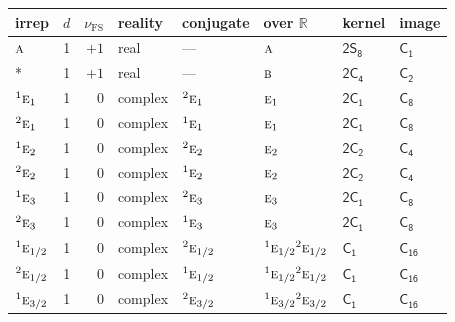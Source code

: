 \documentclass[10pt,a4paper]{article}
\makeatletter
\def\grouprule#1#2{\noalign{\marks\LTgroupmarks{\the\belowrulesep}\nobreak\vskip#1%
  \vskip\aboverulesep}\multispan\LT@cols\unskip{\leaders\hrule\@height#2\hfill\kern\z@}\cr
  \noalign{\penalty\LTrulebreak\vskip\belowrulesep\global\@lastruleclass\z@}}
\numberwithin{equation}{section}
\newcommand{\grp}[1]{\mathsf{#1}}
\newcommand{\irr}[1]{\text{\normalfont\scshape #1}}
\newcommand{\conjpair}[1]{{}^{#1}}
\newcommand{\detbox}[1]{{\setlength{\fboxsep}{1pt}\fbox{#1}}}
\newcommand{\fsind}{\nu_{\mathrm{FS}}}
\makeatother
\begin{document}
{\small\renewcommand{\arraystretch}{1.25}\setlength{\tabcolsep}{4pt}\begin{longtable}{@{}lrrlllll@{}}\toprule
irrep & $d$ & $\fsind$ & reality & conjugate & over $\mathbb{R}$ & kernel & image\\\midrule\endhead
\bottomrule\endfoot\endlastfoot
$\irr{a}$ & 1 & $+1$ & real & --- & $\irr{a}$ & \href{2S8.pdf}{$\grp{2S_{8}}$} & \href{../../../rotation/data/pdf/C1.pdf}{$\grp{C_{1}}$}\\*
\detbox{$\irr{b}$} & 1 & $+1$ & real & --- & $\irr{b}$ & \href{2C4.pdf}{$\grp{2C_{4}}$} & \href{../../../rotation/data/pdf/C2.pdf}{$\grp{C_{2}}$}\\
$\conjpair{1}\irr{e}_{1}$ & 1 & $0$ & complex & $\conjpair{2}\irr{e}_{1}$ & $\irr{e}_{1}$ & \href{2C1.pdf}{$\grp{2C_{1}}$} & \href{../../../rotation/data/pdf/C8.pdf}{$\grp{C_{8}}$}\\
$\conjpair{2}\irr{e}_{1}$ & 1 & $0$ & complex & $\conjpair{1}\irr{e}_{1}$ & $\irr{e}_{1}$ & \href{2C1.pdf}{$\grp{2C_{1}}$} & \href{../../../rotation/data/pdf/C8.pdf}{$\grp{C_{8}}$}\\
$\conjpair{1}\irr{e}_{2}$ & 1 & $0$ & complex & $\conjpair{2}\irr{e}_{2}$ & $\irr{e}_{2}$ & \href{2C2.pdf}{$\grp{2C_{2}}$} & \href{../../../rotation/data/pdf/C4.pdf}{$\grp{C_{4}}$}\\
$\conjpair{2}\irr{e}_{2}$ & 1 & $0$ & complex & $\conjpair{1}\irr{e}_{2}$ & $\irr{e}_{2}$ & \href{2C2.pdf}{$\grp{2C_{2}}$} & \href{../../../rotation/data/pdf/C4.pdf}{$\grp{C_{4}}$}\\
$\conjpair{1}\irr{e}_{3}$ & 1 & $0$ & complex & $\conjpair{2}\irr{e}_{3}$ & $\irr{e}_{3}$ & \href{2C1.pdf}{$\grp{2C_{1}}$} & \href{../../../rotation/data/pdf/C8.pdf}{$\grp{C_{8}}$}\\
$\conjpair{2}\irr{e}_{3}$ & 1 & $0$ & complex & $\conjpair{1}\irr{e}_{3}$ & $\irr{e}_{3}$ & \href{2C1.pdf}{$\grp{2C_{1}}$} & \href{../../../rotation/data/pdf/C8.pdf}{$\grp{C_{8}}$}\\
\grouprule{0pt}{\lightrulewidth}
$\conjpair{1}\irr{e}_{1/2}$ & 1 & $0$ & complex & $\conjpair{2}\irr{e}_{1/2}$ & $\conjpair{1}\irr{e}_{1/2}\conjpair{2}\irr{e}_{1/2}$ & \href{C1.pdf}{$\grp{C_{1}}$} & $\grp{C_{16}}$\\
$\conjpair{2}\irr{e}_{1/2}$ & 1 & $0$ & complex & $\conjpair{1}\irr{e}_{1/2}$ & $\conjpair{1}\irr{e}_{1/2}\conjpair{2}\irr{e}_{1/2}$ & \href{C1.pdf}{$\grp{C_{1}}$} & $\grp{C_{16}}$\\
$\conjpair{1}\irr{e}_{3/2}$ & 1 & $0$ & complex & $\conjpair{2}\irr{e}_{3/2}$ & $\conjpair{1}\irr{e}_{3/2}\conjpair{2}\irr{e}_{3/2}$ & \href{C1.pdf}{$\grp{C_{1}}$} & $\grp{C_{16}}$\\

\end{longtable}}
\end{document}
